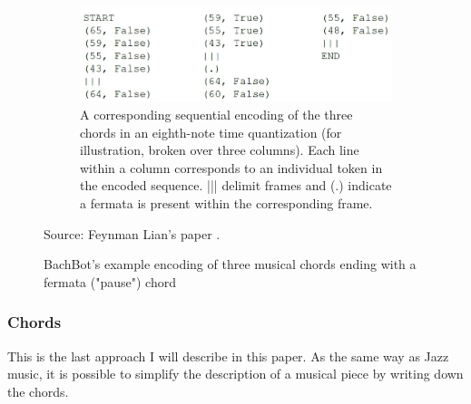 \documentclass[12pt]{report}
\begin{document}
\begin{figure}[h]
    \hfill
    \begin{subfigure}[t]{0.67\textwidth}
        \centering
        \includegraphics[width=.9 \textwidth]{images/related_works/bachbot/bachbot_encoding_text.jpg}
        \caption{A corresponding sequential encoding of the three chords in an eighth-note time quantization (for illustration, broken over three columns). Each line within a column corresponds to an individual token in the encoded sequence. ||| delimit frames and (.) indicate a fermata is present within the corresponding frame.}
        \label{fig:relatedwork_bachbot_text}
    \end{subfigure}
    \caption{BachBot's example encoding of three musical chords ending with a fermata ("pause") chord}
    Source: Feynman Lian's paper \cite{liang_automatic_2017}.
    \label{fig:relatedwork_bachbot}
\end{figure}


\subsubsection{Chords}

This is the last approach I will describe in this paper.
As the same way as Jazz music, it is possible to simplify the description of a musical piece by writing down the chords.
\end{document}
